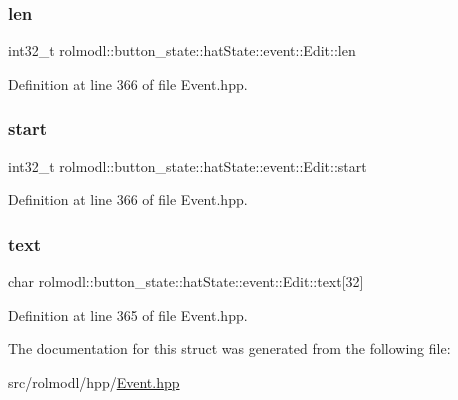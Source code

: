 \subsubsection{\texorpdfstring{len}{len}}
{\footnotesize\ttfamily int32\+\_\+t rolmodl\+::button\+\_\+state\+::hat\+State\+::event\+::\+Edit\+::len}



Definition at line 366 of file Event.\+hpp.

\mbox{\label{structrolmodl_1_1button__state_1_1hat_state_1_1event_1_1_edit_aae557e7b09b7d19721a40a65fac8280b}} 
\subsubsection{\texorpdfstring{start}{start}}
{\footnotesize\ttfamily int32\+\_\+t rolmodl\+::button\+\_\+state\+::hat\+State\+::event\+::\+Edit\+::start}



Definition at line 366 of file Event.\+hpp.

\mbox{\label{structrolmodl_1_1button__state_1_1hat_state_1_1event_1_1_edit_a94d119dadc822ab2ba1fb04202d17602}} 
\subsubsection{\texorpdfstring{text}{text}}
{\footnotesize\ttfamily char rolmodl\+::button\+\_\+state\+::hat\+State\+::event\+::\+Edit\+::text\mbox{[}32\mbox{]}}



Definition at line 365 of file Event.\+hpp.



The documentation for this struct was generated from the following file\+:\begin{DoxyCompactItemize}
\item 
src/rolmodl/hpp/\mbox{\hyperlink{_event_8hpp}{Event.\+hpp}}\end{DoxyCompactItemize}
